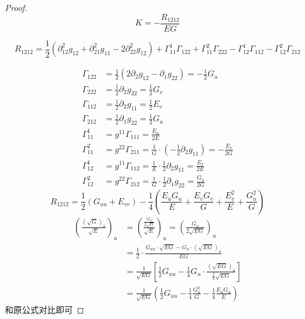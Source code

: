 \documentclass[lang=cn,10pt,thmcnt=section]{elegantbook}
\begin{document}
\begin{proof}
    \[K=-\frac{R_{1212}}{EG}\]

    \[
        R_{1212}=\frac{1}{2}(\partial^2_{12}g_{12}+\partial^2_{21}g_{11}-2\partial^2_{22}g_{12})+\Gamma_{11}^1\Gamma_{122}+\Gamma_{11}^2\Gamma_{222}-\Gamma_{12}^1\Gamma_{112}-\Gamma_{12}^2\Gamma_{212}
    \]

    \begin{align*}
        \Gamma_{122} &= \frac{1}{2} (2\partial_2 g_{12} - \partial_1 g_{22}) = -\frac{1}{2} G_u \\
        \Gamma_{222} &= \frac{1}{2} \partial_2 g_{22} = \frac{1}{2} G_v \\
        \Gamma_{112} &= \frac{1}{2} \partial_2 g_{11} = \frac{1}{2} E_v \\
        \Gamma_{212} &= \frac{1}{2} \partial_1 g_{22} = \frac{1}{2} G_u \\
        \Gamma_{11}^1 &= g^{11} \Gamma_{111} = \frac{E_u}{2E} \\
        \Gamma_{11}^2 &= g^{22} \Gamma_{211} = \frac{1}{G} \cdot \left( -\frac{1}{2} \partial_2 g_{11} \right) = -\frac{E_v}{2G} \\
        \Gamma_{12}^1 &= g^{11} \Gamma_{112} = \frac{1}{E} \cdot \frac{1}{2} \partial_2 g_{11} = \frac{E_v}{2E} \\
        \Gamma_{12}^2 &= g^{22} \Gamma_{212} = \frac{1}{G} \cdot \frac{1}{2} \partial_1 g_{22} = \frac{G_u}{2G}
    \end{align*}
\[
R_{1212} = \frac{1}{2} (G_{uu} + E_{vv}) - \frac{1}{4} \left( \frac{E_u G_u}{E} + \frac{E_v G_v}{G} + \frac{E_v^2}{E} + \frac{G_u^2}{G} \right)
\]
\begin{align*}
    \left(\frac{(\sqrt{G})_u}{\sqrt{E}}\right)_u 
    &= \left(\frac{\frac{G_u}{2\sqrt{G}}}{\sqrt{E}}\right)_u 
    = \left(\frac{G_u}{2\sqrt{EG}}\right)_u \\
    &= \frac{1}{2} \cdot \frac{G_{uu} \cdot \sqrt{EG} - G_u \cdot (\sqrt{EG})_u}{EG} \\
    &= \frac{1}{\sqrt{EG}} \left[ \frac{1}{2} G_{uu} - \frac{1}{4} G_u \cdot \frac{(\sqrt{EG})_u}{\frac{1}{2}\sqrt{EG}} \right] \\
    &= \frac{1}{\sqrt{EG}} \left( \frac{1}{2} G_{uu} - \frac{1}{4} \frac{G_u^2}{G} - \frac{1}{4} \frac{E_u G_u}{E} \right)
\end{align*}
和原公式对比即可

\end{proof}
\end{document}
